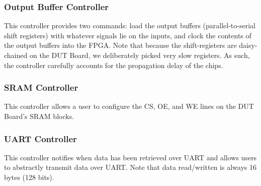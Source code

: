 \subsubsection{Output Buffer Controller}
This controller provides two commands: load the output buffers (parallel-to-serial shift registers) with whatever signals lie on the inputs, and clock the contents of the output buffers into the FPGA. Note that because the shift-registers are daisy-chained on the DUT Board, we deliberately picked very slow registers. As such, the controller carefully accounts for the propagation delay of the chips.

\subsubsection{SRAM Controller}
This controller allows a user to configure the CS, OE, and WE lines on the DUT Board's SRAM blocks.

\subsubsection{UART Controller}
This controller notifies when data has been retrieved over UART and allows users to abstractly transmit data over UART. Note that data read/written is always 16 bytes (128 bits).

